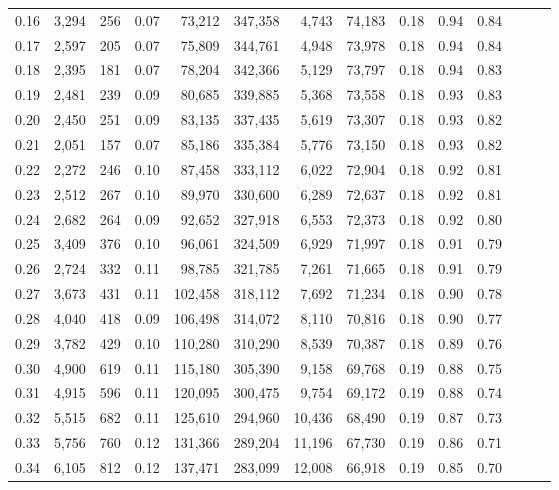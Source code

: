 \begin{tabular}{rrrrrrrrrrrrrr}
0.16 &  3,294 &    256 &  0.07 &   73,212 &  347,358 &   4,743 &  74,183 &  0.18 &  0.94 &      0.84 \\
0.17 &  2,597 &    205 &  0.07 &   75,809 &  344,761 &   4,948 &  73,978 &  0.18 &  0.94 &      0.84 \\
0.18 &  2,395 &    181 &  0.07 &   78,204 &  342,366 &   5,129 &  73,797 &  0.18 &  0.94 &      0.83 \\
0.19 &  2,481 &    239 &  0.09 &   80,685 &  339,885 &   5,368 &  73,558 &  0.18 &  0.93 &      0.83 \\
0.20 &  2,450 &    251 &  0.09 &   83,135 &  337,435 &   5,619 &  73,307 &  0.18 &  0.93 &      0.82 \\
0.21 &  2,051 &    157 &  0.07 &   85,186 &  335,384 &   5,776 &  73,150 &  0.18 &  0.93 &      0.82 \\
0.22 &  2,272 &    246 &  0.10 &   87,458 &  333,112 &   6,022 &  72,904 &  0.18 &  0.92 &      0.81 \\
0.23 &  2,512 &    267 &  0.10 &   89,970 &  330,600 &   6,289 &  72,637 &  0.18 &  0.92 &      0.81 \\
0.24 &  2,682 &    264 &  0.09 &   92,652 &  327,918 &   6,553 &  72,373 &  0.18 &  0.92 &      0.80 \\
0.25 &  3,409 &    376 &  0.10 &   96,061 &  324,509 &   6,929 &  71,997 &  0.18 &  0.91 &      0.79 \\
0.26 &  2,724 &    332 &  0.11 &   98,785 &  321,785 &   7,261 &  71,665 &  0.18 &  0.91 &      0.79 \\
0.27 &  3,673 &    431 &  0.11 &  102,458 &  318,112 &   7,692 &  71,234 &  0.18 &  0.90 &      0.78 \\
0.28 &  4,040 &    418 &  0.09 &  106,498 &  314,072 &   8,110 &  70,816 &  0.18 &  0.90 &      0.77 \\
0.29 &  3,782 &    429 &  0.10 &  110,280 &  310,290 &   8,539 &  70,387 &  0.18 &  0.89 &      0.76 \\
0.30 &  4,900 &    619 &  0.11 &  115,180 &  305,390 &   9,158 &  69,768 &  0.19 &  0.88 &      0.75 \\
0.31 &  4,915 &    596 &  0.11 &  120,095 &  300,475 &   9,754 &  69,172 &  0.19 &  0.88 &      0.74 \\
0.32 &  5,515 &    682 &  0.11 &  125,610 &  294,960 &  10,436 &  68,490 &  0.19 &  0.87 &      0.73 \\
0.33 &  5,756 &    760 &  0.12 &  131,366 &  289,204 &  11,196 &  67,730 &  0.19 &  0.86 &      0.71 \\
0.34 &  6,105 &    812 &  0.12 &  137,471 &  283,099 &  12,008 &  66,918 &  0.19 &  0.85 &      0.70 \\

\end{tabular}
